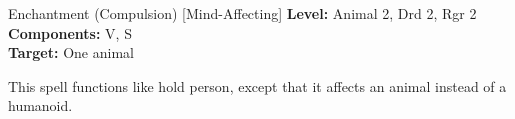 {Enchantment (Compulsion) [Mind-Affecting]}
{
	\textbf{Level:}
	Animal 2, Drd 2, Rgr 2\\
	\textbf{Components:}
	V, S\\
	\textbf{Target:}
	One animal\\
}
{
	This spell functions like hold person, except that it affects an animal instead of a humanoid.

}
